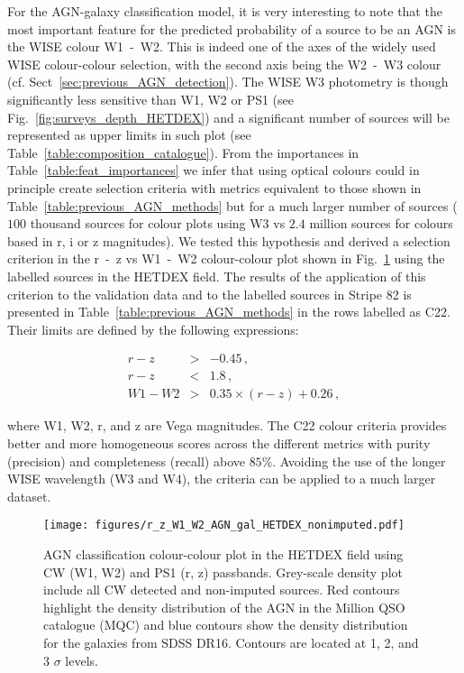 \documentclass{aa}
\begin{document}
For the AGN-galaxy classification model, it is very interesting to note that the most important feature for the predicted probability of a source to be an AGN is the WISE colour W1~-~W2. This is indeed one of the axes of the widely used WISE colour-colour selection, with the second axis being the W2~-~W3 colour (cf. Sect~\ref{sec:previous_AGN_detection}). The WISE W3 photometry is though significantly less sensitive than W1, W2 or PS1 (see Fig.~\ref{fig:surveys_depth_HETDEX}) and a significant number of sources will be represented as upper limits in such plot (see Table~\ref{table:composition_catalogue}). From the importances in Table~\ref{table:feat_importances} we infer that using optical colours could in principle create selection criteria with metrics equivalent to those shown in Table~\ref{table:previous_AGN_methods} but for a much larger number of sources ($100$ thousand sources for colour plots using W3 vs $2.4$ million sources for colours based in r, i or z magnitudes). We tested this hypothesis and derived a selection criterion in the r~-~z vs W1~-~W2 colour-colour plot shown in Fig.~\ref{fig:HETDEX_rz_W1W2_AGN_gal_class} using the labelled sources in the HETDEX field. The results of the application of this criterion to the validation data and to the labelled sources in Stripe 82 is presented in Table~\ref{table:previous_AGN_methods} in the rows labelled as C22. Their limits are defined by the following expressions:

\begin{eqnarray}
r - z &>& -0.45\,,\\
r - z &<& 1.8\,,\\
W1 - W2 &>& 0.35 \times (r - z) + 0.26\,,
\end{eqnarray}

\noindent where W1, W2, r, and z are Vega magnitudes. The C22 colour criteria provides better and more homogeneous scores across the different metrics with purity (precision) and completeness (recall) above $85\%$. Avoiding the use of the longer WISE wavelength (W3 and W4), the criteria can be applied to a much larger dataset.


\begin{figure}
    \centering
    \begin{minipage}{0.99\columnwidth}
    \texttt{[image: figures/r\_z\_W1\_W2\_AGN\_gal\_HETDEX\_nonimputed.pdf]}
    \end{minipage}%
    \caption{AGN classification colour-colour plot in the HETDEX field using CW (W1, W2) and PS1 (r, z) passbands. Grey-scale density plot include all CW detected and non-imputed sources. Red contours highlight the density distribution of the AGN in the Million QSO catalogue (MQC) and blue contours show the density distribution for the galaxies from SDSS DR16. Contours are located at 1, 2, and 3 $\sigma$ levels.}
   \label{fig:HETDEX_rz_W1W2_AGN_gal_class}
\end{figure}
\end{document}
